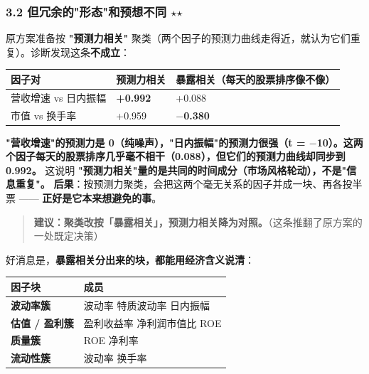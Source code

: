 \documentclass[11pt]{article}
\begin{document}
\subsubsection{\texorpdfstring{3.2 但冗余的"形态"和预想不同 $\star$$\star$}{3.2 但冗余的"形态"和预想不同 ★★}}
原方案准备按 \textbf{"预测力相关"} 聚类（两个因子的预测力曲线走得近，就认为它们重复）。诊断发现这条\textbf{不成立}：
{\small
\begin{longtable}{p{4.91cm}p{2.45cm}p{8.84cm}}
\toprule
因子对 & 预测力相关 & \textbf{暴露相关}（每天的股票排序像不像） \\
\midrule
营收增速 vs 日内振幅 & \textbf{+0.992} & +0.088 \\
市值 vs 换手率 & +0.959 & \textbf{\ensuremath{-}0.380} \\
\bottomrule
\end{longtable}
}
\textbf{"营收增速"的预测力是 0（纯噪声），"日内振幅"的预测力很强（t = \ensuremath{-}10）。这两个因子每天的股票排序几乎毫不相干（0.088），但它们的预测力曲线却同步到 0.992。}
这说明 \textbf{"预测力相关"量的是共同的时间成分（市场风格轮动），不是"信息重复"。}
\textbf{后果}：按预测力聚类，会把这两个毫无关系的因子并成一块、再各投半票 ------ \textbf{正好是它本来想避免的事}。
\begin{quote}
\textbf{建议：聚类改按「暴露相关」，预测力相关降为对照。}（这条推翻了原方案的一处既定决策）
\end{quote}
好消息是，\textbf{暴露相关分出来的块，都能用经济含义说清}：
{\small
\begin{longtable}{p{5.74cm}p{10.46cm}}
\toprule
因子块 & 成员 \\
\midrule
\textbf{波动率簇} & 波动率 \textperiodcentered{} 特质波动率 \textperiodcentered{} 日内振幅 \\
\textbf{估值 / 盈利簇} & 盈利收益率 \textperiodcentered{} 净利润市值比 \textperiodcentered{} ROE \\
\textbf{质量簇} & ROE \textperiodcentered{} 净利率 \\
\textbf{流动性簇} & 波动率 \textperiodcentered{} 换手率 \\
\bottomrule
\end{longtable}
}
\end{document}
